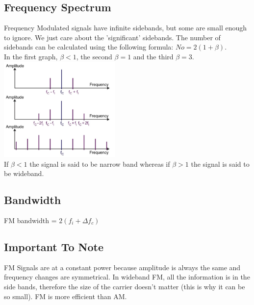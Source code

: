 \documentclass[a4paper,11pt, twocolumn]{article}
\begin{document}
\subsection{Frequency Spectrum}
Frequency Modulated signals have infinite sidebands, but some are small enough to ignore. We just care about the 'significant' sidebands. The number of sidebands can be calculated using the following formula: $No = 2(1+\beta)$.\\
In the first graph, $\beta < 1$, the second $\beta = 1$ and the third $\beta = 3$.
\includegraphics[width=0.45\textwidth]{fmSidebands.jpg}\\
If $\beta < 1$ the signal is said to be narrow band whereas if $\beta >1$ the signal is said to be wideband. 
\subsection{Bandwidth}
FM bandwidth = $2(f_i + \Delta f_c)$
\subsection{Important To Note}
FM Signals are at a constant power because amplitude is always the same and frequency changes are symmetrical. In wideband FM, all the information is in the side bands, therefore the size of the carrier doesn't matter (this is why it can be so small). FM is more efficient than AM.
\end{document}
